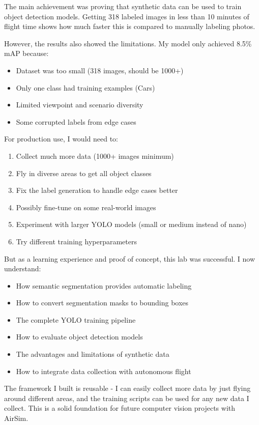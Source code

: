The main achievement was proving that synthetic data can be used to train object detection models. Getting 318 labeled images in less than 10 minutes of flight time shows how much faster this is compared to manually labeling photos.

However, the results also showed the limitations. My model only achieved 8.5\% mAP because:
\begin{itemize}
	\item Dataset was too small (318 images, should be 1000+)
	\item Only one class had training examples (Cars)
	\item Limited viewpoint and scenario diversity
	\item Some corrupted labels from edge cases
\end{itemize}

For production use, I would need to:
\begin{enumerate}
	\item Collect much more data (1000+ images minimum)
	\item Fly in diverse areas to get all object classes
	\item Fix the label generation to handle edge cases better
	\item Possibly fine-tune on some real-world images
	\item Experiment with larger YOLO models (small or medium instead of nano)
	\item Try different training hyperparameters
\end{enumerate}

But as a learning experience and proof of concept, this lab was successful. I now understand:
\begin{itemize}
	\item How semantic segmentation provides automatic labeling
	\item How to convert segmentation masks to bounding boxes
	\item The complete YOLO training pipeline
	\item How to evaluate object detection models
	\item The advantages and limitations of synthetic data
	\item How to integrate data collection with autonomous flight
\end{itemize}

The framework I built is reusable - I can easily collect more data by just flying around different areas, and the training scripts can be used for any new data I collect. This is a solid foundation for future computer vision projects with AirSim.

\clearpage
